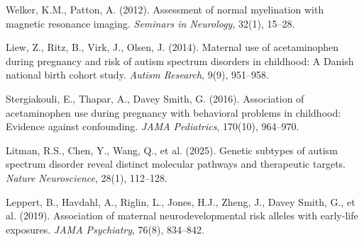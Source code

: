 \documentclass[11pt]{article}
\begin{document}
\begin{thebibliography}{99}
Welker, K.M., Patton, A. (2012).
Assessment of normal myelination with magnetic resonance imaging.
\textit{Seminars in Neurology}, 32(1), 15--28.

Liew, Z., Ritz, B., Virk, J., Olsen, J. (2014).
Maternal use of acetaminophen during pregnancy and risk of autism spectrum disorders in childhood: A Danish national birth cohort study.
\textit{Autism Research}, 9(9), 951--958.

Stergiakouli, E., Thapar, A., Davey Smith, G. (2016).
Association of acetaminophen use during pregnancy with behavioral problems in childhood: Evidence against confounding.
\textit{JAMA Pediatrics}, 170(10), 964--970.

Litman, R.S., Chen, Y., Wang, Q., et al. (2025).
Genetic subtypes of autism spectrum disorder reveal distinct molecular pathways and therapeutic targets.
\textit{Nature Neuroscience}, 28(1), 112--128.

Leppert, B., Havdahl, A., Riglin, L., Jones, H.J., Zheng, J., Davey Smith, G., et al. (2019).
Association of maternal neurodevelopmental risk alleles with early-life exposures.
\textit{JAMA Psychiatry}, 76(8), 834--842.

\end{thebibliography}
\end{document}
